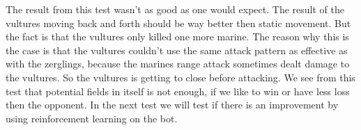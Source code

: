 The result from this test wasn't as good as one would expect. The result of the vultures moving back and forth should be way better then static movement. But the fact is that the vultures only killed one more marine. The reason why this is the case is that the vultures couldn't use the same attack pattern as effective as with the zerglings, because the marines range attack sometimes dealt damage to the vultures. So the vultures is getting to close before attacking.
We see from this test that potential fields in itself is not enough, if we like to win or have less loss then the opponent. In the next test we will test if there is an improvement by using reinforcement learning on the bot.




